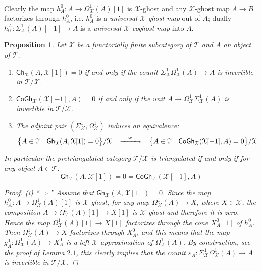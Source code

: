 \documentclass[oneside, a4paper,reqno]{amsart}
\numberwithin{equation}{section}
\newtheorem{prop}[thm]{Proposition}
\theoremstyle{definition}
\begin{document}
\,

Clearly the map $h^{0}_{A} \colon A {\longrightarrow} \Omega^{1}_{\mathcal X}(A)[1]$ is ${\mathcal X}$-ghost and any ${\mathcal X}$-ghost map $A {\longrightarrow} B$ factorizes through $h^{0}_{A}$, i.e. $h^{0}_{A}$ is a {\em universal ${\mathcal X}$-ghost map} out of $A$; dually $h^{A}_{0} \colon \Sigma^{1}_{\mathcal X}(A)[-1] {\longrightarrow} A$ is a {\em universal ${\mathcal X}$-coghost map} into $A$.   

\begin{prop} Let ${\mathcal X}$ be a functorially finite subcategory of ${\mathcal T}$ and $A$ an object of ${\mathcal T}$. 
\begin{enumerate}
\item $\mathsf{Gh}_{\mathcal X}(A,{\mathcal X}[1]) = 0$ if and only if  the counit $\Sigma^{1}_{\mathcal X}\Omega^{1}_{\mathcal X}(A) {\longrightarrow} A$ is invertible in ${\mathcal T}/{\mathcal X}$.
\item  $\mathsf{CoGh}_{\mathcal X}({\mathcal X}[-1],A) = 0$ if and only if the unit $A {\longrightarrow} \Omega^{1}_{\mathcal X}\Sigma^{1}_{\mathcal X}(A)$ is invertible in ${\mathcal T}/{\mathcal X}$.
\item The adjoint pair $(\Sigma^{1}_{\mathcal X}, \Omega^{1}_{\mathcal X})$ induces an equivalence: 
\[
\begin{CD}
\big\{A  \in {\mathcal T} \ | \ \mathsf{Gh}_{\mathcal X}(A,{\mathcal X}[1]) = 0\big\}/{\mathcal X} \ \ @> \approx >> \ \ \big\{A  \in {\mathcal T} \ | \ \mathsf{CoGh}_{\mathcal X}({\mathcal X}[-1],A) = 0\big\}/{\mathcal X} 
\end{CD}
\]
\end{enumerate}
In particular the pretriangulated category ${\mathcal T}/{\mathcal X}$ is triangulated if and only if  for any object $A \in {\mathcal T}$:
\[\mathsf{Gh}_{\mathcal X}(A,{\mathcal X}[1]) = 0 = \mathsf{CoGh}_{\mathcal X}({\mathcal X}[-1], A)\] 
\begin{proof} (i)  ``$\Longrightarrow$'' Assume that $\mathsf{Gh}_{\mathcal X}(A,{\mathcal X}[1]) = 0$. Since the map $h^{0}_{A} \colon A {\longrightarrow} \Omega^{1}_{\mathcal X}(A)[1]$ is ${\mathcal X}$-ghost,  for any map $\Omega^{1}_{\mathcal X}(A) {\longrightarrow} X$, where $X \in {\mathcal X}$, the composition $A {\longrightarrow} \Omega^{1}_{\mathcal X}(A)[1] {\longrightarrow} X[1]$ is ${\mathcal X}$-ghost and therefore it is zero. Hence the map $\Omega^{1}_{\mathcal X}(A)[1] {\longrightarrow} X[1]$ factorizes through the cone $X^{0}_{A}[1]$ of $h^{0}_{A}$. Then $\Omega^{1}_{\mathcal X}(A) {\longrightarrow} X$ factorizes through  $X^{0}_{A}$, and  this means that the map $g^{0}_{A} \colon \Omega^{1}_{\mathcal X}(A) {\longrightarrow} X^{0}_{A}$ is a left ${\mathcal X}$-approximation of $\Omega^{1}_{\mathcal X}(A)$. By construction, see the proof of Lemma $2.1$,  this clearly implies that the counit $\varepsilon_{A} \colon \Sigma^{1}_{\mathcal X}\Omega^{1}_{\mathcal X}(A) {\longrightarrow} A$ is invertible in ${\mathcal T}/{\mathcal X}$. 


\end{proof}
\end{prop}
\end{document}
